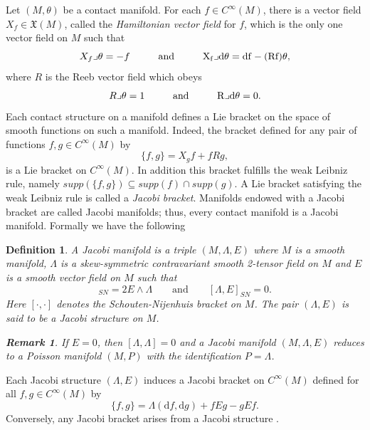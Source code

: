 \documentclass[10pt]{amsart}
\numberwithin{equation}{section}
\newcommand{\rd}{\mathrm{d}}
\newtheorem{definition}{Definition}
\theoremstyle{definition}
\newtheorem{remark}{\textbf{Remark}}
\begin{document}
\vspace{2mm}
Let $(M,\theta)$ be a contact manifold. For each $f\in C^{\infty}(M)$, there is a vector field $X_{f}\in \mathfrak{X}(M)$, called the \textit{Hamiltonian vector field} for $f$, which is the only one vector field on $M$ such that
\begin{equation}
X_{f}\lrcorner \theta = -f \hspace{1cm}\rm{and}\hspace{1cm} X_{f}\lrcorner d\theta =df-(Rf)\theta,
\end{equation}
where $R$ is the Reeb vector field which obeys 
\begin{equation}
R\lrcorner \theta =1 \hspace{1cm}\rm{and}\hspace{1cm} R\lrcorner d\theta =0.
\end{equation}
Each contact structure on a manifold defines a Lie bracket on the space of smooth functions on such a manifold. Indeed, the bracket defined for any pair of functions $f,g\in C^{\infty}(M)$ by
\begin{equation}
\lbrace f,g\rbrace=X_{g}f+fRg,
\end{equation}
is a Lie bracket on $C^{\infty}(M)$. In addition this bracket fulfills the weak Leibniz rule, namely
$supp(\lbrace f,g\rbrace)\subseteq supp(f)\cap supp(g)$. A Lie bracket satisfying the weak Leibniz rule is called a \textit{Jacobi bracket}. Manifolds endowed with a Jacobi bracket are called Jacobi manifolds; thus, every contact manifold is a Jacobi manifold. Formally we have the following
\begin{definition}
A Jacobi manifold is a triple $(M,\Lambda,E)$ where $M$ is a smooth manifold, $\Lambda$ is a skew-symmetric contravariant smooth 2-tensor field on $M$ and $E$ is a smooth vector field on $M$ such that
\begin{equation}
[\Lambda,\Lambda]_{SN}=2E\wedge \Lambda \qquad\text{and}\qquad [\Lambda,E]_{SN}=0.
\end{equation}
Here $[\cdot,\cdot]$ denotes the Schouten-Nijenhuis bracket on $M$. The pair $(\Lambda,E)$ is said to be a Jacobi structure on $M$. 
\begin{remark}
If $E=0$, then $[\Lambda,\Lambda]=0$ and a Jacobi manifold $(M,\Lambda,E)$ reduces to a Poisson manifold $(M,P)$ with the identification $P=\Lambda$. 
\end{remark}
\end{definition}
Each Jacobi structure $(\Lambda,E)$ induces a Jacobi bracket on $C^{\infty}(M)$ defined  for all $f,g\in C^{\infty}(M)$ by
\begin{equation} \label{eq:2.16}
\lbrace f,g\rbrace=\Lambda(\rd f,\rd g)+fEg-gEf.
\end{equation}
Conversely, any Jacobi bracket arises from a Jacobi structure \cite{ILM1997,Marle1991}. 
\vspace{2mm}
\end{document}
